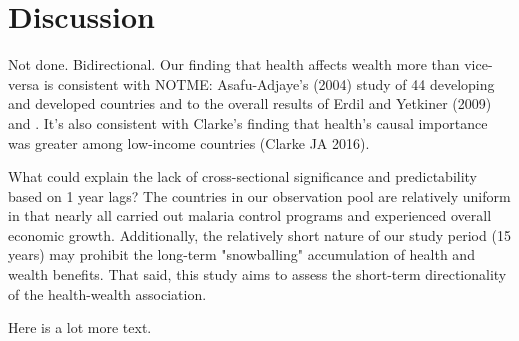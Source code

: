 \documentclass[9pt,twocolumn,twoside,lineno]{pnas-new}
\begin{document}
\section*{Discussion}

Not done. Bidirectional. Our finding that health affects wealth more than vice-versa is consistent with NOTME: Asafu-Adjaye’s (2004) study of 44 developing and developed countries and to the overall results of Erdil and Yetkiner (2009) and . It’s also consistent with Clarke’s finding that health’s causal importance was greater among low-income countries (Clarke JA 2016).

What could explain the lack of cross-sectional significance and predictability based on 1 year lags? The countries in our observation pool are relatively uniform in that nearly all carried out malaria control programs and experienced overall economic growth. Additionally, the relatively short nature of our study period (15 years) may prohibit the long-term "snowballing" accumulation of health and wealth benefits. That said, this study aims to assess the short-term directionality of the health-wealth association. 




Here is a lot more text.  



\showmatmethods %

\pnasbreak



\end{document}
